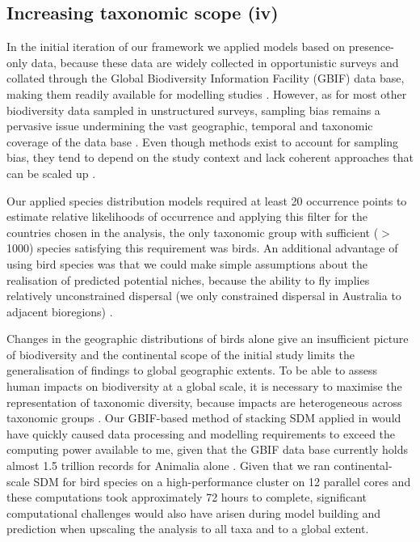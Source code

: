 \subsection{Increasing taxonomic scope (iv)}
In the initial iteration of our framework we applied models based on presence-only data, because these data are widely collected in opportunistic surveys and collated through the Global Biodiversity Information Facility (GBIF) data base, making them readily available for modelling studies \citep{gbif_gbif_2016}. However, as for most other biodiversity data sampled in unstructured surveys, sampling bias remains a pervasive issue undermining the vast geographic, temporal and taxonomic coverage of the data base \citep{troia_filling_2016, kapitza_assessing_2021}. Even though methods exist to account for sampling bias, they tend to depend on the study context and lack coherent approaches that can be scaled up \citep{kramer-schadt_importance_2013, stolar_accounting_2015, kapitza_assessing_2021, fithian_bias_2015}.

Our applied species distribution models required at least 20 occurrence points to estimate relative likelihoods of occurrence and applying this filter for the countries chosen in the analysis, the only taxonomic group with sufficient (\(>\)1000) species satisfying this requirement was birds. An additional advantage of using bird species was that we could make simple assumptions about the realisation of predicted potential niches, because the ability to fly implies relatively unconstrained dispersal (we only constrained dispersal in Australia to adjacent bioregions) \citep{kapitza_assessing_2021}.

Changes in the geographic distributions of birds alone give an insufficient picture of biodiversity and the continental scope of the initial study limits the generalisation of findings to global geographic extents. To be able to assess human impacts on biodiversity at a global scale, it is necessary to maximise the representation of taxonomic diversity, because impacts are heterogeneous across taxonomic groups \citep{hudson_predicts_2014}. Our GBIF-based method of stacking SDM applied in  would have quickly caused data processing and modelling requirements to exceed the computing power available to me, given that the GBIF data base currently holds almost 1.5 trillion records for Animalia alone \citep{gbiforg_gbif_2021}. Given that we ran continental-scale SDM for bird species on a high-performance cluster on 12 parallel cores and these computations took approximately 72 hours to complete, significant computational challenges would also have arisen during model building and prediction when upscaling the analysis to all taxa and to a global extent. 

